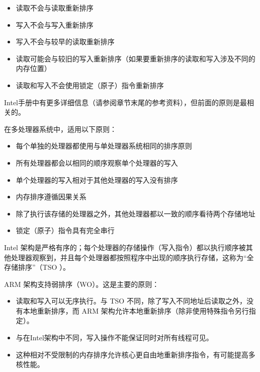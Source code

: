 \begin{itemize}
\item
读取不会与读取重新排序

\item
写入不会与写入重新排序

\item
写入不会与较早的读取重新排序

\item
读取可能会与较旧的写入重新排序（如果要重新排序的读取和写入涉及不同的内存位置）

\item
读取和写入不会使用锁定（原子）指令重新排序
\end{itemize}

Intel手册中有更多详细信息（请参阅章节末尾的参考资料），但前面的原则是最相关的。

在多处理器系统中，适用以下原则：

\begin{itemize}
\item
每个单独的处理器都使用与单处理器系统相同的排序原则

\item
所有处理器都会以相同的顺序观察单个处理器的写入

\item
单个处理器的写入相对于其他处理器的写入没有排序

\item
内存排序遵循因果关系

\item
除了执行该存储的处理器之外，其他处理器都以一致的顺序看待两个存储地址

\item
锁定（原子）指令具有完全串行
\end{itemize}

Intel 架构是严格有序的；每个处理器的存储操作（写入指令）都以执行顺序被其他处理器观察到，并且每个处理器都按照程序中出现的顺序执行存储，这称为“全存储排序”（TSO ）。

ARM 架构支持弱排序（WO）。这是主要的原则：

\begin{itemize}
\item
读取和写入可以无序执行。与 TSO 不同，除了写入不同地址后读取之外，没有本地重新排序，而 ARM 架构允许本地重新排序（除非使用特殊指令另行指定）。

\item
与在Intel架构中不同，写入操作不能保证同时对所有线程可见。

\item
这种相对不受限制的内存排序允许核心更自由地重新排序指令，有可能提高多核性能。
\end{itemize}

